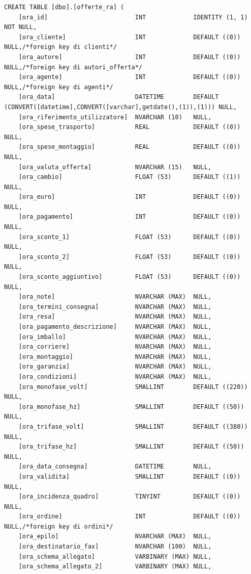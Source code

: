 \documentclass[12pt]{article}
\begin{document}
\begin{lstlisting}
CREATE TABLE [dbo].[offerte_ra] (
    [ora_id]                        INT             IDENTITY (1, 1) NOT NULL,
    [ora_cliente]                   INT             DEFAULT ((0)) NULL,/*foreign key di clienti*/
    [ora_autore]                    INT             DEFAULT ((0)) NULL,/*foreign key di autori_offerta*/
    [ora_agente]                    INT             DEFAULT ((0)) NULL,/*foreign key di agenti*/
    [ora_data]                      DATETIME        DEFAULT (CONVERT([datetime],CONVERT([varchar],getdate(),(1)),(1))) NULL,
    [ora_riferimento_utilizzatore]  NVARCHAR (10)   NULL,
    [ora_spese_trasporto]           REAL            DEFAULT ((0)) NULL,
    [ora_spese_montaggio]           REAL            DEFAULT ((0)) NULL,
    [ora_valuta_offerta]            NVARCHAR (15)   NULL,
    [ora_cambio]                    FLOAT (53)      DEFAULT ((1)) NULL,
    [ora_euro]                      INT             DEFAULT ((0)) NULL,
    [ora_pagamento]                 INT             DEFAULT ((0)) NULL,
    [ora_sconto_1]                  FLOAT (53)      DEFAULT ((0)) NULL,
    [ora_sconto_2]                  FLOAT (53)      DEFAULT ((0)) NULL,
    [ora_sconto_aggiuntivo]         FLOAT (53)      DEFAULT ((0)) NULL,
    [ora_note]                      NVARCHAR (MAX)  NULL,
    [ora_termini_consegna]          NVARCHAR (MAX)  NULL,
    [ora_resa]                      NVARCHAR (MAX)  NULL,
    [ora_pagamento_descrizione]     NVARCHAR (MAX)  NULL,
    [ora_imballo]                   NVARCHAR (MAX)  NULL,
    [ora_corriere]                  NVARCHAR (MAX)  NULL,
    [ora_montaggio]                 NVARCHAR (MAX)  NULL,
    [ora_garanzia]                  NVARCHAR (MAX)  NULL,
    [ora_condizioni]                NVARCHAR (MAX)  NULL,
    [ora_monofase_volt]             SMALLINT        DEFAULT ((220)) NULL,
    [ora_monofase_hz]               SMALLINT        DEFAULT ((50)) NULL,
    [ora_trifase_volt]              SMALLINT        DEFAULT ((380)) NULL,
    [ora_trifase_hz]                SMALLINT        DEFAULT ((50)) NULL,
    [ora_data_consegna]             DATETIME        NULL,
    [ora_validita]                  SMALLINT        DEFAULT ((0)) NULL,
    [ora_incidenza_quadro]          TINYINT         DEFAULT ((0)) NULL,
    [ora_ordine]                    INT             DEFAULT ((0)) NULL,/*foreign key di ordini*/
    [ora_epilo]                     NVARCHAR (MAX)  NULL,
    [ora_destinatario_fax]          NVARCHAR (100)  NULL,
    [ora_schema_allegato]           VARBINARY (MAX) NULL,
    [ora_schema_allegato_2]         VARBINARY (MAX) NULL,

\end{lstlisting}
\end{document}
